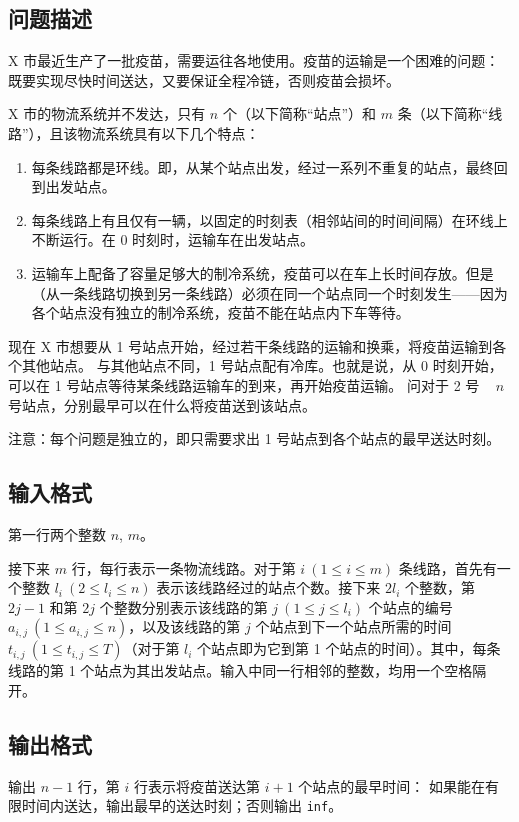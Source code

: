 \subsection*{问题描述}

X 市最近生产了一批疫苗，需要运往各地使用。疫苗的运输是一个困难的问题：既要实现尽快时间送达，又要保证全程冷链，否则疫苗会损坏。

X 市的物流系统并不发达，只有 $n$ 个{}（以下简称“站点”）和 $m$ 条{}（以下简称“线路”），且该物流系统具有以下几个特点：

\begin{enumerate}

\item 每条线路都是环线。即，从某个站点出发，经过一系列不重复的站点，最终回到出发站点。

\item 每条线路上有且仅有一辆{}，以固定的时刻表（相邻站间的时间间隔）在环线上不断运行。在 0 时刻时，运输车在出发站点。

\item 运输车上配备了容量足够大的制冷系统，疫苗可以在车上长时间存放。但是{}（从一条线路切换到另一条线路）必须在同一个站点同一个时刻发生——因为各个站点没有独立的制冷系统，疫苗不能在站点内下车等待。

\end{enumerate}

现在 X 市想要从 1 号站点开始，经过若干条线路的运输和换乘，将疫苗运输到各个其他站点。
与其他站点不同，1 号站点配有冷库。也就是说，从 0 时刻开始，可以在 1 号站点等待某条线路运输车的到来，再开始疫苗运输。
问对于 2 号 ~ $n$ 号站点，分别最早可以在什么{}将疫苗送到该站点。

注意：每个问题是独立的，即只需要求出 1 号站点到各个站点的最早送达时刻。


\subsection*{输入格式}

第一行两个整数 $n$, $m$。

接下来 $m$ 行，每行表示一条物流线路。对于第 $i ~ (1 \le i \le m)$ 条线路，首先有一个整数 $l_i ~ (2 \le l_i \le n)$ 表示该线路经过的站点个数。接下来 $2 l_i$ 个整数，第 $2j-1$ 和第 $2j$ 个整数分别表示该线路的第 $j ~ (1 \le j \le l_i)$ 个站点的编号 $a_{i,j} ~ (1 \le a_{i,j} \le n)$，以及该线路的第 $j$ 个站点到下一个站点所需的时间 $t_{i,j} ~ (1 \le t_{i,j} \le T)$（对于第 $l_i$ 个站点即为它到第 1 个站点的时间）。其中，每条线路的第 1 个站点为其出发站点。输入中同一行相邻的整数，均用一个空格隔开。


\subsection*{输出格式}

输出 $n - 1$ 行，第 $i$ 行表示将疫苗送达第 $i+1$ 个站点的最早时间：
如果能在有限时间内送达，输出最早的送达时刻；否则输出 \verb|inf|。


